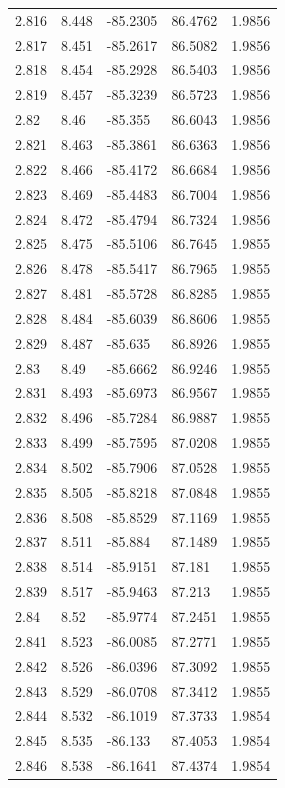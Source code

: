 \begin{tabular}{lllll}
2.816 & 8.448 & -85.2305 & 86.4762 & 1.9856 \\
2.817 & 8.451 & -85.2617 & 86.5082 & 1.9856 \\
2.818 & 8.454 & -85.2928 & 86.5403 & 1.9856 \\
2.819 & 8.457 & -85.3239 & 86.5723 & 1.9856 \\
2.82 & 8.46 & -85.355 & 86.6043 & 1.9856 \\
2.821 & 8.463 & -85.3861 & 86.6363 & 1.9856 \\
2.822 & 8.466 & -85.4172 & 86.6684 & 1.9856 \\
2.823 & 8.469 & -85.4483 & 86.7004 & 1.9856 \\
2.824 & 8.472 & -85.4794 & 86.7324 & 1.9856 \\
2.825 & 8.475 & -85.5106 & 86.7645 & 1.9855 \\
2.826 & 8.478 & -85.5417 & 86.7965 & 1.9855 \\
2.827 & 8.481 & -85.5728 & 86.8285 & 1.9855 \\
2.828 & 8.484 & -85.6039 & 86.8606 & 1.9855 \\
2.829 & 8.487 & -85.635 & 86.8926 & 1.9855 \\
2.83 & 8.49 & -85.6662 & 86.9246 & 1.9855 \\
2.831 & 8.493 & -85.6973 & 86.9567 & 1.9855 \\
2.832 & 8.496 & -85.7284 & 86.9887 & 1.9855 \\
2.833 & 8.499 & -85.7595 & 87.0208 & 1.9855 \\
2.834 & 8.502 & -85.7906 & 87.0528 & 1.9855 \\
2.835 & 8.505 & -85.8218 & 87.0848 & 1.9855 \\
2.836 & 8.508 & -85.8529 & 87.1169 & 1.9855 \\
2.837 & 8.511 & -85.884 & 87.1489 & 1.9855 \\
2.838 & 8.514 & -85.9151 & 87.181 & 1.9855 \\
2.839 & 8.517 & -85.9463 & 87.213 & 1.9855 \\
2.84 & 8.52 & -85.9774 & 87.2451 & 1.9855 \\
2.841 & 8.523 & -86.0085 & 87.2771 & 1.9855 \\
2.842 & 8.526 & -86.0396 & 87.3092 & 1.9855 \\
2.843 & 8.529 & -86.0708 & 87.3412 & 1.9855 \\
2.844 & 8.532 & -86.1019 & 87.3733 & 1.9854 \\
2.845 & 8.535 & -86.133 & 87.4053 & 1.9854 \\
2.846 & 8.538 & -86.1641 & 87.4374 & 1.9854 \\

\end{tabular}
